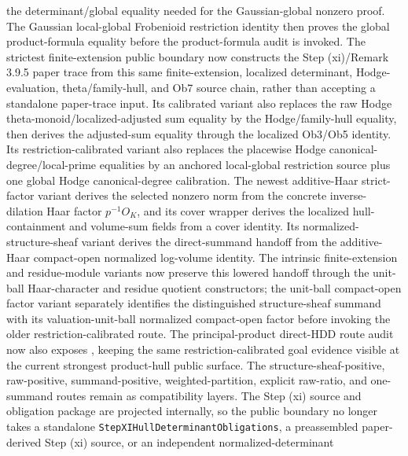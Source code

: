 \begin{proposition}
  the determinant/global equality needed for the Gaussian-global nonzero proof.
  The Gaussian local-global Frobenioid restriction identity then proves the
  global product-formula equality before the product-formula audit is invoked.
  The strictest finite-extension public boundary now constructs the
  Step (xi)/Remark 3.9.5 paper trace from this same finite-extension,
  localized determinant, Hodge-evaluation, theta/family-hull, and Ob7 source
  chain, rather than accepting a standalone paper-trace input.  Its calibrated
  variant also replaces the raw Hodge theta-monoid/localized-adjusted sum
  equality by the Hodge/family-hull equality, then derives the adjusted-sum
  equality through the localized Ob3/Ob5 identity.  Its restriction-calibrated
	  variant also replaces the placewise Hodge canonical-degree/local-prime
	  equalities by an anchored local-global restriction source plus one global
	  Hodge canonical-degree calibration.  The newest additive-Haar strict-factor
	  variant derives the selected nonzero norm from the concrete inverse-dilation
	  Haar factor \(p^{-1}O_K\), and its cover wrapper derives the localized
	  hull-containment and volume-sum fields from a cover identity.  Its
	  normalized-structure-sheaf variant derives the direct-summand handoff from
	  the additive-Haar compact-open normalized log-volume identity.  The
	  intrinsic finite-extension and residue-module variants now preserve this
	  lowered handoff through the unit-ball Haar-character and residue quotient
	  constructors; the unit-ball
	  compact-open factor variant
	  separately identifies the distinguished structure-sheaf summand with its
	  valuation-unit-ball normalized compact-open factor before invoking the older
  restriction-calibrated route.  The principal-product direct-HDD route audit
  now also exposes
  ,
  keeping the same restriction-calibrated goal evidence visible at the current
  strongest product-hull public surface.
  The structure-sheaf-positive, raw-positive, summand-positive,
  weighted-partition, explicit raw-ratio, and one-summand routes remain as
  compatibility layers.  The Step (xi) source and
  obligation package are projected internally, so the public boundary no longer
  takes a standalone \texttt{StepXIHullDeterminantObligations}, a preassembled
  paper-derived Step (xi) source, or an independent normalized-determinant

\end{proposition}

